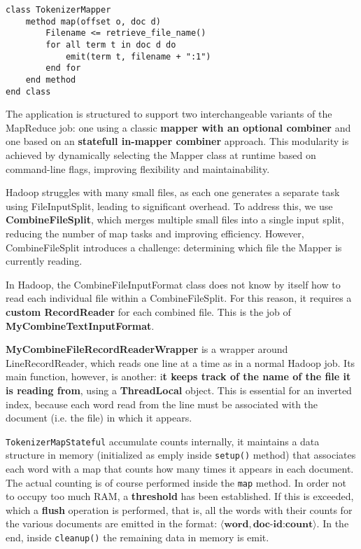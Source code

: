 \vspace{-1em}
\begin{center}
	\begin{minipage}{\linewidth}
		\begin{lstlisting}[language=PseudoCode]
class TokenizerMapper
	method map(offset o, doc d)
		Filename <= retrieve_file_name()
		for all term t in doc d do
			emit(term t, filename + ":1")
		end for
	end method
end class
		\end{lstlisting}
		\label{fig:pseudocode-stateless-mapper}
	\end{minipage}
\end{center}

\columnbreak

The application is structured to support two interchangeable variants of the MapReduce job: one using a classic \textbf{mapper with an optional combiner} and one based on an \textbf{statefull in-mapper combiner} approach. This modularity is achieved by dynamically selecting the Mapper class at runtime based on command-line flags, improving flexibility and maintainability. 

Hadoop struggles with many small files, as each one generates a separate task using FileInputSplit, leading to significant overhead. To address this, we use \textbf{CombineFileSplit}, which merges multiple small files into a single input split, reducing the number of map tasks and improving efficiency. However, CombineFileSplit introduces a challenge: determining which file the Mapper is currently reading.  

In Hadoop, the CombineFileInputFormat class does not know by itself how to read each individual file within a CombineFileSplit. For this reason, it requires a \textbf{custom RecordReader} for each combined file. This is the job of \textbf{MyCombineTextInputFormat}.

\textbf{MyCombineFileRecordReaderWrapper} is a wrapper around LineRecordReader, which reads one line at a time as in a normal Hadoop job. Its main function, however, is another: i\textbf{t keeps track of the name of the file it is reading from}, using a \textbf{ThreadLocal} object. This is essential for an inverted index, because each word read from the line must be associated with the document (i.e. the file) in which it appears. 

\texttt{TokenizerMapStateful} accumulate counts internally, it maintains a data structure in memory (initialized as emply inside \texttt{setup()} method) that associates each word with a map that counts how many times it appears in each document. The actual counting is of course performed inside the \texttt{map} method. In order not to occupy too much RAM, a \textbf{threshold} has been established. If this is exceeded, which a \textbf{flush} operation is performed, that is, all the words with their counts for the various documents are emitted in the format: $ \langle \textbf{word}, \textbf{doc-id:count} \rangle $. In the end, inside \texttt{cleanup()} the remaining data in memory is emit.


